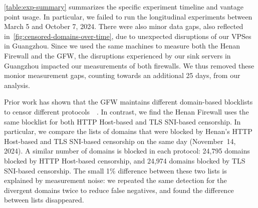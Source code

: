 \documentclass[conference,compsoc]{IEEEtran}
\begin{document}
\autoref{table:exp-summary} summarizes the specific experiment timeline and vantage point usage.
In particular,
we failed to run the longitudinal experiments between March 5 and October 7, 2024.
There were also minor data gaps,
also reflected in~\autoref{fig:censored-domains-over-time},
due to unexpected disruptions of our VPSes in Guangzhou.
Since we used the same machines to measure both the Henan Firewall and the GFW,
the disruptions experienced by our sink servers in Guangzhou impacted our measurements of both firewalls.
We thus removed these monior measurement gaps,
counting towards an additional 25 days,
from our analysis.


%
Prior work has shown that the GFW maintains different domain-based blocklists
to censor different protocols~\cite[\S 4.1]{Chai2019a}~\cite[\S 5.2]{Hoang2024a}.
In contrast, we find
the Henan Firewall uses the same blocklist for both HTTP Host-based and TLS SNI-based censorship.
In particular,
we compare the lists of domains that were blocked by Henan's HTTP Host-based and TLS SNI-based censorship
on the same day (November~14, 2024).
A similar number of domains is blocked in each protocol: 24,795 domains blocked by HTTP Host-based censorship, and 24,974 domains blocked by TLS SNI-based censorship.
The small 1\% difference between these two lists is explained by measurement noise: we repeated the same detection for the divergent domains twice to reduce false negatives, and found the difference between lists disappeared.

\end{document}
